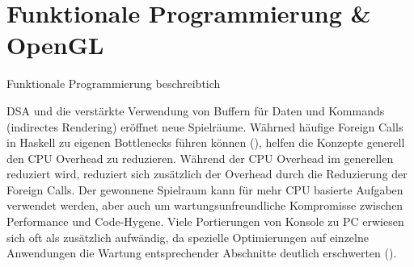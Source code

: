 \chapter{Funktionale Programmierung \& OpenGL}

Funktionale Programmierung beschreibtich

\ac{DSA} und die verstärkte Verwendung von Buffern für Daten und Kommands (indirectes Rendering) eröffnet neue Spielräume. Währned häufige Foreign Calls in Haskell zu eigenen Bottlenecks führen können (), helfen die Konzepte generell den CPU Overhead zu reduzieren. Während der CPU Overhead im generellen reduziert wird, reduziert sich zusätzlich der Overhead durch die Reduzierung der Foreign Calls. Der gewonnene Spielraum kann für mehr CPU basierte Aufgaben verwendet werden, aber auch um wartungsunfreundliche Kompromisse zwischen Performance und Code-Hygene. Viele Portierungen von Konsole zu PC erwiesen sich oft als zusätzlich aufwändig, da spezielle Optimierungen auf einzelne Anwendungen die Wartung entsprechender Abschnitte deutlich erschwerten ().